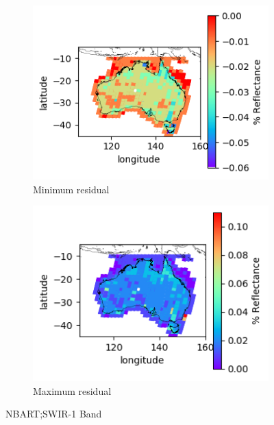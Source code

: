 \documentclass[a4paper]{article}
\begin{document}
      \begin{figure}[h!]
        \centering
          \begin{subfigure}[l]{.4\linewidth}
            \hspace{-32mm}
            \includegraphics[scale=0.9]{plots/nbart/nbart_swir_1-MinResidual.png}
            \caption{Minimum residual}
          \end{subfigure}
%
          \begin{subfigure}[r]{.4\linewidth}
            \includegraphics[scale=0.9]{plots/nbart/nbart_swir_1-MaxResidual.png}
            \caption{Maximum residual}
          \end{subfigure}
        \caption{NBART;\@ SWIR-1 Band}\label{figure:11}
      \end{figure}
\end{document}
